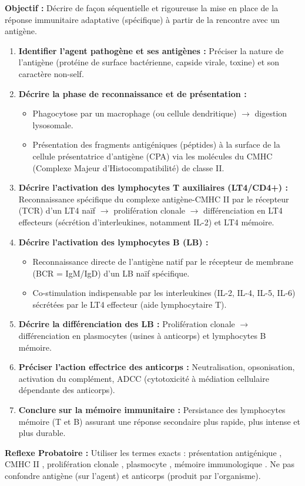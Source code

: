 \documentclass[11pt]{article}
\newcommand{\cle}[1]{{\popxbold\color{popdark}#1}}
\begin{document}
\begin{methode}
    \textbf{Objectif :} Décrire de façon séquentielle et rigoureuse la mise en place de la réponse immunitaire adaptative (spécifique) à partir de la rencontre avec un antigène.
    \begin{enumerate}
        \item \textbf{Identifier l'agent pathogène et ses antigènes :} Préciser la nature de l'antigène (protéine de surface bactérienne, capside virale, toxine) et son caractère \cle{non-self}.
        \item \textbf{Décrire la phase de reconnaissance et de présentation :} 
        \begin{itemize}
            \item Phagocytose par un macrophage (ou cellule dendritique) $\rightarrow$ digestion lysosomale.
            \item Présentation des fragments antigéniques (péptides) à la surface de la cellule présentatrice d'antigène (CPA) via les molécules du \cle{CMHC} (Complexe Majeur d'Histocompatibilité) de classe II.
        \end{itemize}
        \item \textbf{Décrire l'activation des lymphocytes T auxiliaires (LT4/CD4+) :} Reconnaissance spécifique du complexe \og antigène-CMHC II \fg par le récepteur (TCR) d'un LT4 naïf $\rightarrow$ prolifération clonale $\rightarrow$ différenciation en LT4 effecteurs (sécrétion d'interleukines, notamment IL-2) et LT4 mémoire.
        \item \textbf{Décrire l'activation des lymphocytes B (LB) :} 
        \begin{itemize}
            \item Reconnaissance directe de l'antigène natif par le récepteur de membrane (BCR = IgM/IgD) d'un LB naïf spécifique.
            \item Co-stimulation indispensable par les interleukines (IL-2, IL-4, IL-5, IL-6) sécrétées par le LT4 effecteur (aide lymphocytaire T).
        \end{itemize}
        \item \textbf{Décrire la différenciation des LB :} Prolifération clonale $\rightarrow$ différenciation en \cle{plasmocytes} (usines à anticorps) et \cle{lymphocytes B mémoire}.
        \item \textbf{Préciser l'action effectrice des anticorps :} Neutralisation, opsonisation, activation du complément, ADCC (cytotoxicité à médiation cellulaire dépendante des anticorps).
        \item \textbf{Conclure sur la mémoire immunitaire :} Persistance des lymphocytes mémoire (T et B) assurant une réponse secondaire plus rapide, plus intense et plus durable.
    \end{enumerate}
    \textbf{Reflexe Probatoire :} Utiliser les termes exacts : \og présentation antigénique \fg, \og CMHC II \fg, \og prolifération clonale \fg, \og plasmocyte \fg, \og mémoire immunologique \fg. Ne pas confondre antigène (sur l'agent) et anticorps (produit par l'organisme).
\end{methode}
\end{document}
